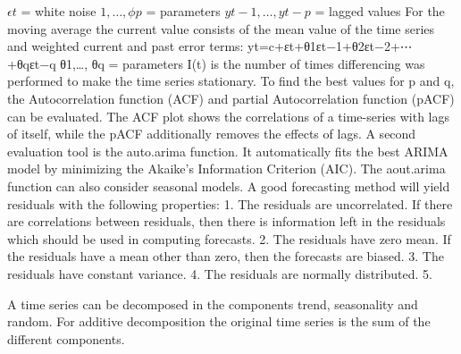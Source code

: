 	$\epsilon t$ = white noise
	$1,…,\phi p$ = parameters
	$yt-1,…, yt-p$ = lagged values 
	For the moving average the current value consists of the mean value of the time series and weighted current and past error terms: 
	yt=c+εt+θ1εt−1+θ2εt−2+⋯+θqεt−q
	θ1,…, θq = parameters
	I(t) is the number of times differencing was performed to make the time series stationary.
	To find the best values for p and q, the Autocorrelation function (ACF) and partial Autocorrelation function (pACF) can be evaluated. The ACF plot shows the correlations of a time-series with lags of itself, while the pACF additionally removes the effects of lags. 
	A second evaluation tool is the auto.arima function. It automatically fits the best ARIMA model by minimizing the Akaike’s Information Criterion (AIC). The aout.arima function can also consider seasonal models.  
	A good forecasting method will yield residuals with the following properties:
	1.	The residuals are uncorrelated. If there are correlations between residuals, then there is information left in the residuals which should be used in computing forecasts.
	2.	The residuals have zero mean. If the residuals have a mean other than zero, then the forecasts are biased.
	3.	The residuals have constant variance.
	4.	The residuals are normally distributed.
	5.	
	
	A time series can be decomposed in the components trend, seasonality and random. For additive decomposition the original time series is the sum of the different components.
	
